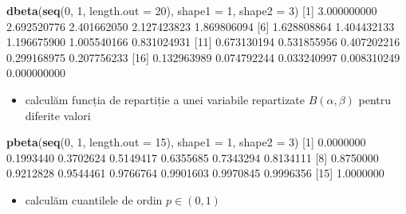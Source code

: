 \documentclass[]{article}
\newenvironment{Shaded}{\begin{snugshade}}{\end{snugshade}}
\newcommand{\KeywordTok}[1]{\textcolor[rgb]{0.13,0.29,0.53}{\textbf{#1}}}
\newcommand{\DataTypeTok}[1]{\textcolor[rgb]{0.13,0.29,0.53}{#1}}
\newcommand{\DecValTok}[1]{\textcolor[rgb]{0.00,0.00,0.81}{#1}}
\newcommand{\FloatTok}[1]{\textcolor[rgb]{0.00,0.00,0.81}{#1}}
\newcommand{\NormalTok}[1]{#1}
\providecommand{\tightlist}{%
  \setlength{\itemsep}{0pt}\setlength{\parskip}{0pt}}
\begin{document}
\begin{Shaded}
\begin{Highlighting}[]
\KeywordTok{dbeta}\NormalTok{(}\KeywordTok{seq}\NormalTok{(}\DecValTok{0}\NormalTok{, }\DecValTok{1}\NormalTok{, }\DataTypeTok{length.out =} \DecValTok{20}\NormalTok{), }\DataTypeTok{shape1 =} \DecValTok{1}\NormalTok{, }\DataTypeTok{shape2 =} \DecValTok{3}\NormalTok{)}
\NormalTok{ [}\DecValTok{1}\NormalTok{] }\FloatTok{3.000000000} \FloatTok{2.692520776} \FloatTok{2.401662050} \FloatTok{2.127423823} \FloatTok{1.869806094}
\NormalTok{ [}\DecValTok{6}\NormalTok{] }\FloatTok{1.628808864} \FloatTok{1.404432133} \FloatTok{1.196675900} \FloatTok{1.005540166} \FloatTok{0.831024931}
\NormalTok{[}\DecValTok{11}\NormalTok{] }\FloatTok{0.673130194} \FloatTok{0.531855956} \FloatTok{0.407202216} \FloatTok{0.299168975} \FloatTok{0.207756233}
\NormalTok{[}\DecValTok{16}\NormalTok{] }\FloatTok{0.132963989} \FloatTok{0.074792244} \FloatTok{0.033240997} \FloatTok{0.008310249} \FloatTok{0.000000000}
\end{Highlighting}
\end{Shaded}

\begin{itemize}
\tightlist
\item
  calculăm funcția de repartiție a unei variabile repartizate
  \(B(\alpha, \beta)\) pentru diferite valori
\end{itemize}

\begin{Shaded}
\begin{Highlighting}[]
\KeywordTok{pbeta}\NormalTok{(}\KeywordTok{seq}\NormalTok{(}\DecValTok{0}\NormalTok{, }\DecValTok{1}\NormalTok{, }\DataTypeTok{length.out =} \DecValTok{15}\NormalTok{), }\DataTypeTok{shape1 =} \DecValTok{1}\NormalTok{, }\DataTypeTok{shape2 =} \DecValTok{3}\NormalTok{)}
\NormalTok{ [}\DecValTok{1}\NormalTok{] }\FloatTok{0.0000000} \FloatTok{0.1993440} \FloatTok{0.3702624} \FloatTok{0.5149417} \FloatTok{0.6355685} \FloatTok{0.7343294} \FloatTok{0.8134111}
\NormalTok{ [}\DecValTok{8}\NormalTok{] }\FloatTok{0.8750000} \FloatTok{0.9212828} \FloatTok{0.9544461} \FloatTok{0.9766764} \FloatTok{0.9901603} \FloatTok{0.9970845} \FloatTok{0.9996356}
\NormalTok{[}\DecValTok{15}\NormalTok{] }\FloatTok{1.0000000}
\end{Highlighting}
\end{Shaded}

\begin{itemize}
\tightlist
\item
  calculăm cuantilele de ordin \(p\in(0,1)\)
\end{itemize}
\end{document}
